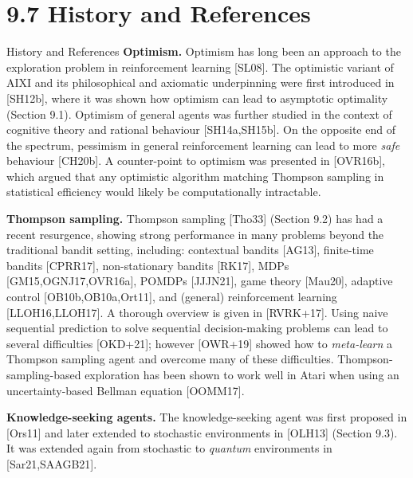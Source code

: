 \documentclass[aspectratio=169,10pt]{beamer}
\begin{document}
\section{9.7 History and References}

\begin{frame}[allowframebreaks]{History and References}
  \textbf{Optimism.} Optimism has long been an approach to the exploration
  problem in reinforcement learning [SL08]. The optimistic variant of AIXI
  and its philosophical and axiomatic underpinning were first introduced in
  [SH12b], where it was shown how optimism can lead to asymptotic
  optimality (Section 9.1). Optimism of general agents was further studied
  in the context of cognitive theory and rational behaviour [SH14a,SH15b].
  On the opposite end of the spectrum, pessimism in general reinforcement
  learning can lead to more \emph{safe} behaviour [CH20b]. A counter-point
  to optimism was presented in [OVR16b], which argued that any optimistic
  algorithm matching Thompson sampling in statistical efficiency would
  likely be computationally intractable.

  \framebreak
  \textbf{Thompson sampling.} Thompson sampling [Tho33] (Section 9.2) has
  had a recent resurgence, showing strong performance in many problems
  beyond the traditional bandit setting, including: contextual bandits
  [AG13], finite-time bandits [CPRR17], non-stationary bandits [RK17],
  MDPs [GM15,OGNJ17,OVR16a], POMDPs [JJJN21], game theory [Mau20], adaptive
  control [OB10b,OB10a,Ort11], and (general) reinforcement learning
  [LLOH16,LLOH17]. A thorough overview is given in [RVRK+17]. Using naive
  sequential prediction to solve sequential decision-making problems can
  lead to several difficulties [OKD+21]; however [OWR+19] showed how to
  \emph{meta-learn} a Thompson sampling agent and overcome many of these
  difficulties. Thompson-sampling-based exploration has been shown to
  work well in Atari when using an uncertainty-based Bellman equation
  [OOMM17].

  \framebreak
  \textbf{Knowledge-seeking agents.} The knowledge-seeking agent was first
  proposed in [Ors11] and later extended to stochastic environments in
  [OLH13] (Section 9.3). It was extended again from stochastic to
  \emph{quantum} environments in [Sar21,SAAGB21].


\end{frame}
\end{document}
